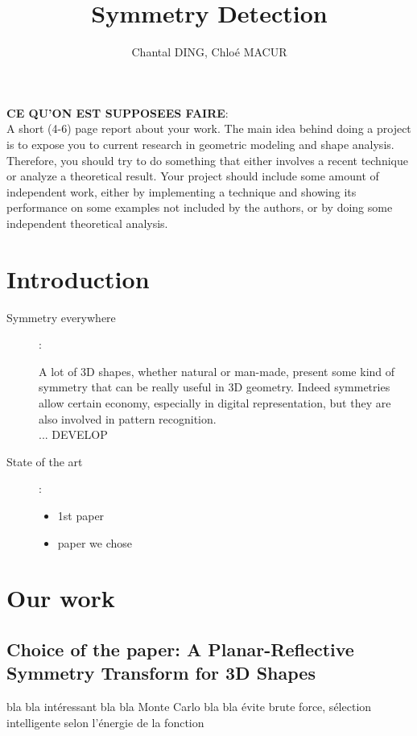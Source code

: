 \documentclass[10pt,a4paper]{article}			%
\title{Symmetry Detection}
\author{Chantal DING, Chloé MACUR}
\begin{document}


\newpage
\tableofcontents
\newpage

\textbf{CE QU'ON EST SUPPOSEES FAIRE}: \\
A short (4-6) page report about your work.
The main idea behind doing a project is to expose you to current research in geometric modeling and shape analysis. Therefore, you should try to do something that either involves a recent technique or analyze a theoretical result. Your project should include some amount of independent work, either by implementing a technique and showing its performance on some examples not included by the authors, or by doing some independent theoretical analysis.

	
	\section*{Introduction}

	\begin{description}	
  \item[Symmetry everywhere]:
  
	A lot of 3D shapes, whether natural or man-made, present some kind of symmetry that can be really useful in 3D geometry.  Indeed symmetries allow certain economy, especially in digital representation, but they are also involved in pattern recognition.\\ ... DEVELOP \\
  
  \item[State of the art]:
   \begin{itemize}
  \item  1st  paper
  \item paper we chose
  \end{itemize}
  \end{description}

	\section{Our work}
	
	\subsection{Choice of the paper:  A Planar-Reflective Symmetry Transform for 3D Shapes}
	
	bla bla intéressant bla bla Monte Carlo bla bla évite brute force, sélection intelligente selon l'énergie de la fonction
	
\end{document}
